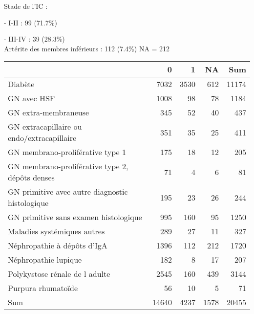 \documentclass[11pt,a4paper]{article}\usepackage[]{graphicx}\usepackage[]{color}
\begin{document}
Stade de l’IC :

- I-II : 99 (71.7\%)

- III-IV : 39 (28.3\%)
~\\

Artérite des membres inférieurs : 112 (7.4\%) NA = 212

\begin{table}[H]
\centering
\begin{tabular}{lrrrr}
  \hline
 & 0 & 1 & NA & Sum \\ 
  \hline
Diabète & 7032 & 3530 & 612 & 11174 \\ 
  GN avec HSF & 1008 & 98 & 78 & 1184 \\ 
  GN extra-membraneuse & 345 & 52 & 40 & 437 \\ 
  GN extracapillaire ou endo/extracapillaire & 351 & 35 & 25 & 411 \\ 
  GN membrano-proliférative type 1 & 175 & 18 & 12 & 205 \\ 
  GN membrano-proliférative type 2, dépôts denses & 71 & 4 & 6 & 81 \\ 
  GN primitive avec autre diagnostic histologique & 195 & 23 & 26 & 244 \\ 
  GN primitive sans examen histologique & 995 & 160 & 95 & 1250 \\ 
  Maladies systémiques autres & 289 & 27 & 11 & 327 \\ 
  Néphropathie à dépôts d'IgA & 1396 & 112 & 212 & 1720 \\ 
  Néphropathie lupique & 182 & 8 & 17 & 207 \\ 
  Polykystose rénale de l adulte & 2545 & 160 & 439 & 3144 \\ 
  Purpura rhumatoïde & 56 & 10 & 5 & 71 \\ 
  Sum & 14640 & 4237 & 1578 & 20455 \\ 
   \hline
\end{tabular}
\end{table}
\end{document}
